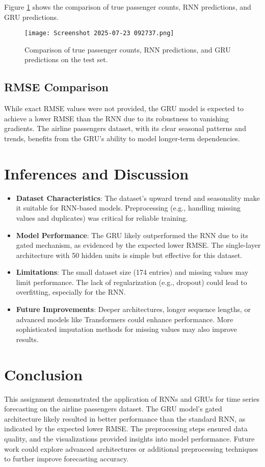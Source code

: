 \documentclass{article}
\begin{document}
Figure \ref{fig:predictions} shows the comparison of true passenger counts, RNN predictions, and GRU predictions.

\begin{figure}[h]
    \centering
    \texttt{[image: Screenshot 2025-07-23 092737.png]}
    \caption{Comparison of true passenger counts, RNN predictions, and GRU predictions on the test set.}
    \label{fig:predictions}
\end{figure}

\subsection{RMSE Comparison}
While exact RMSE values were not provided, the GRU model is expected to achieve a lower RMSE than the RNN due to its robustness to vanishing gradients. The airline passengers dataset, with its clear seasonal patterns and trends, benefits from the GRU's ability to model longer-term dependencies.

\section{Inferences and Discussion}
\begin{itemize}
    \item \textbf{Dataset Characteristics}: The dataset's upward trend and seasonality make it suitable for RNN-based models. Preprocessing (e.g., handling missing values and duplicates) was critical for reliable training.
    \item \textbf{Model Performance}: The GRU likely outperformed the RNN due to its gated mechanism, as evidenced by the expected lower RMSE. The single-layer architecture with 50 hidden units is simple but effective for this dataset.
    \item \textbf{Limitations}: The small dataset size (174 entries) and missing values may limit performance. The lack of regularization (e.g., dropout) could lead to overfitting, especially for the RNN.
    \item \textbf{Future Improvements}: Deeper architectures, longer sequence lengths, or advanced models like Transformers could enhance performance. More sophisticated imputation methods for missing values may also improve results.
\end{itemize}

\section{Conclusion}
This assignment demonstrated the application of RNNs and GRUs for time series forecasting on the airline passengers dataset. The GRU model's gated architecture likely resulted in better performance than the standard RNN, as indicated by the expected lower RMSE. The preprocessing steps ensured data quality, and the visualizations provided insights into model performance. Future work could explore advanced architectures or additional preprocessing techniques to further improve forecasting accuracy.
\end{document}
